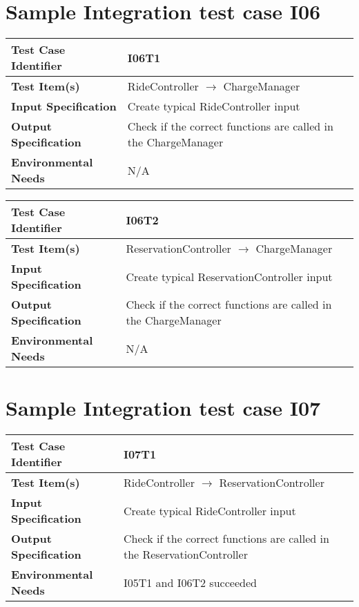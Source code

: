 \section{Sample Integration test case I06}\label{I06}
\begin{center}
	\vspace{0.6cm}
	\begin{tabular}{|l|l|}
		\hline
		\textbf{Test Case Identifier} & I06T1 \bigstrut \\\hline
		\textbf{Test Item(s)} & RideController \ensuremath{\rightarrow} ChargeManager \bigstrut \\\hline
		\textbf{Input Specification} & Create typical RideController input \bigstrut \\\hline
		\textbf{Output Specification} & Check if the correct functions are called in the ChargeManager \bigstrut \\\hline
		\textbf{Environmental Needs} & N/A \bigstrut \\\hline
	\end{tabular}
\end{center}

\begin{center}
	\vspace{0.6cm}
	\begin{tabular}{|l|l|}
		\hline
		\textbf{Test Case Identifier} & I06T2 \bigstrut \\\hline
		\textbf{Test Item(s)} & ReservationController \ensuremath{\rightarrow} ChargeManager \bigstrut \\\hline
		\textbf{Input Specification} & Create typical ReservationController input \bigstrut \\\hline
		\textbf{Output Specification} & Check if the correct functions are called in the ChargeManager \bigstrut \\\hline
		\textbf{Environmental Needs} & N/A \bigstrut \\\hline
	\end{tabular}
\end{center}

\section{Sample Integration test case I07}\label{I07}
\begin{center}
	\vspace{0.6cm}
	\begin{tabular}{|l|l|}
		\hline
		\textbf{Test Case Identifier} & I07T1 \bigstrut \\\hline
		\textbf{Test Item(s)} & RideController \ensuremath{\rightarrow} ReservationController \bigstrut \\\hline
		\textbf{Input Specification} & Create typical RideController input \bigstrut \\\hline
		\textbf{Output Specification} & Check if the correct functions are called in the ReservationController \bigstrut \\\hline
		\textbf{Environmental Needs} & I05T1 and I06T2 succeeded \bigstrut \\\hline
	\end{tabular}
\end{center}


